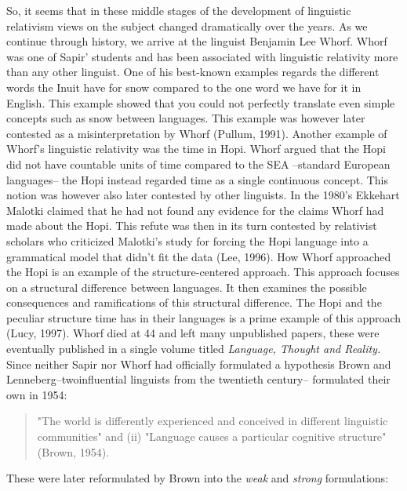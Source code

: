 So, it seems that in these middle stages of the development of linguistic relativism views on the subject changed dramatically over the years. As we continue through history, we arrive at the linguist Benjamin Lee Whorf. Whorf was one of Sapir’ students and has been associated with linguistic relativity more than any other linguist. One of his best-known examples regards the different words the Inuit have for snow compared to the one word we have for it in English. This example showed that you could not perfectly translate even simple concepts such as snow between languages. This example was however later contested as a misinterpretation by Whorf (Pullum, 1991). Another example of Whorf’s linguistic relativity was the time in Hopi. Whorf argued that the Hopi did not have countable units of time compared to the SEA --standard European languages-- the Hopi instead regarded time as a single continuous concept. This notion was however also later contested by other linguists. In the 1980’s Ekkehart Malotki claimed that he had not found  any evidence for the claims Whorf had made about the Hopi. This refute was then in its turn contested by relativist scholars who criticized Malotki’s study for forcing the Hopi language into a grammatical model that didn’t fit the data (Lee, 1996). How Whorf approached the Hopi is an example of the structure-centered approach. This approach focuses on a structural difference between languages. It then examines the possible consequences and ramifications of this structural difference. The Hopi and the peculiar structure time has in their languages is a prime example of this approach (Lucy, 1997).  Whorf died at 44 and left many unpublished papers, these were eventually published in a single volume titled \textit{Language, Thought and Reality.} Since neither Sapir nor Whorf had officially formulated a hypothesis Brown and Lenneberg--twoinfluential linguists from the twentieth century-- formulated their own in 1954:  

\begin{quote}
\begin{singlespace}
"The world is differently experienced and conceived in different linguistic communities" and (ii) "Language causes a particular cognitive structure" (Brown, 1954).
\end{singlespace}
\end{quote}

These were later reformulated by Brown into the \textit{weak} and \textit{strong} formulations: 

